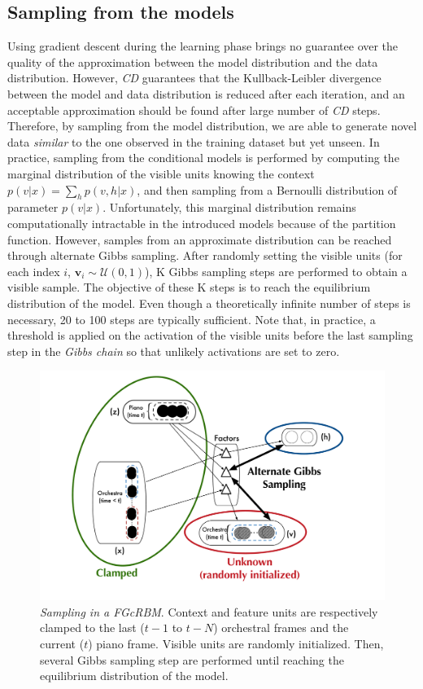 \documentclass[letterpaper]{article}
\begin{document}
\subsection{Sampling from the models}
Using gradient descent during the learning phase brings no guarantee over the quality of the approximation between the model distribution and the data distribution.
However, \textit{CD} guarantees that the Kullback-Leibler divergence between the model and data distribution is reduced after each iteration\cite{hinton2002training}, and an acceptable approximation should be found after large number of \textit{CD} steps.
Therefore, by sampling from the model distribution, we are able to generate novel data \textit{similar} to the one observed in the training dataset but yet unseen. In practice, sampling from the conditional models is performed by computing the marginal distribution of the visible units knowing the context $p(v|x) = \sum_{h} p(v,h|x)$, and then sampling from a Bernoulli distribution of parameter $p(v|x)$.
Unfortunately, this marginal distribution remains computationally intractable in the introduced models because of the partition function. However, samples from an approximate distribution can be reached through alternate Gibbs sampling. After randomly setting the visible units (for each index $i$, $\bm{v}_{i} \sim \mathcal{U}(0,1)$), K Gibbs sampling steps are performed to obtain a visible sample. The objective of these K steps is to reach the equilibrium distribution of the model. Even though a theoretically  infinite number of steps is necessary, 20 to 100 steps are typically sufficient.
Note that, in practice, a threshold is applied on the activation of the visible units before the last sampling step in the \textit{Gibbs chain} so that unlikely activations are set to zero.

\begin{figure}
\centering
\includegraphics[scale=0.14]{FGcRBM_sampling}
\caption{\textit{Sampling in a FGcRBM}. Context and feature units are respectively clamped to the last ($t-1$ to $t-N$) orchestral frames and the current ($t$) piano frame. Visible units are randomly initialized. Then, several Gibbs sampling step are performed until reaching the equilibrium distribution of the model.}
\label{fig:FGcRBM_sampling}
\end{figure}
\end{document}
